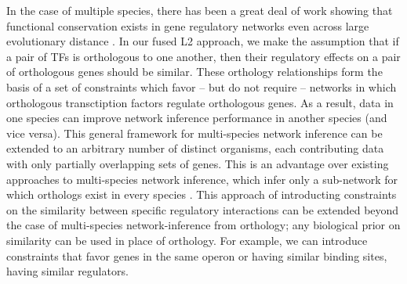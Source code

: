 \documentclass[11pt]{article}
\begin{document}
In the case of multiple species, there has been a great deal of work showing that functional conservation exists in gene regulatory networks even across large evolutionary distance \cite{satou2006gene, hinman2009evolution,tanay2005conservation,erwin2009evolution}. In our fused L2 approach, we make the assumption that if a pair of TFs is orthologous to one another, then their regulatory effects on a pair of orthologous genes should be similar. These orthology relationships form the basis of a set of constraints which favor -- but do not require -- networks in which orthologous transctiption factors regulate orthologous genes. As a result, data in one species can improve network inference performance in another species  (and vice versa). This general framework for multi-species network inference can be extended to an arbitrary number of distinct organisms, each contributing data with only partially overlapping sets of genes. This is an advantage over existing approaches to multi-species network inference, which infer only a sub-network for which orthologs exist in every species \cite{joshi_multi-species_2015}. This approach of introducting constraints on the similarity between specific regulatory interactions can be extended beyond the case of multi-species network-inference from orthology; any biological prior on similarity can be used in place of orthology. For example, we can introduce constraints that favor genes in the same operon or having similar binding sites, having similar regulators.
\end{document}
